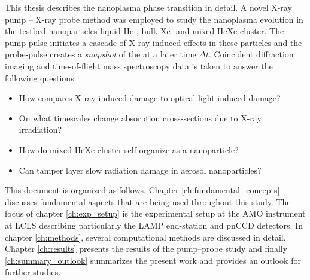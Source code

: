 %
This thesis describes the nanoplasma phase transition in detail. A novel X-ray pump -- X-ray probe method was employed to study the nanoplasma evolution in the testbed nanoparticles liquid He-, bulk Xe- and mixed HeXe-cluster. The pump-pulse initiates a cascade of X-ray induced effects in these particles and the probe-pulse creates a \textit{snapshot} of the at a later time $\Delta t$. Coincident diffraction imaging and time-of-flight mass spectroscopy data is taken to answer the following questions:
\begin{itemize}
	\item How compares X-ray induced damage to optical light induced damage?
	\item On what timescales change absorption cross-sections due to X-ray irradiation?
	\item How do mixed HeXe-cluster self-organize as a nanoparticle?
	\item Can tamper layer slow radiation damage in aerosol nanoparticles?
\end{itemize}
%
This document is organized as follows. Chapter \ref{ch:fundamental_concepts} discusses fundamental aspects that are being used throughout this study. The focus of chapter \ref{ch:exp_setup} is the experimental setup at the AMO instrument at LCLS describing particularly the LAMP end-station and pnCCD detectors. In chapter \ref{ch:methods}, several computational methods are discussed in detail. Chapter \ref{ch:results} presents the results of the pump--probe study and finally \ref{ch:summary_outlook} summarizes the present work and provides an outlook for further studies.
%
%
%
